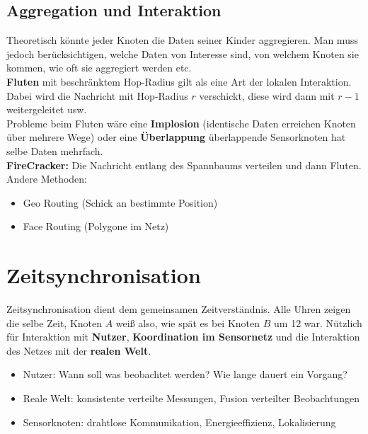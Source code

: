 \documentclass[a4paper]{article}
\begin{document}
\subsection{Aggregation und Interaktion}
Theoretisch könnte jeder Knoten die Daten seiner Kinder aggregieren. Man muss jedoch berücksichtigen, welche Daten von Interesse sind, von welchem Knoten sie kommen, wie oft sie aggregiert werden etc.\\

\textbf{Fluten} mit beschränktem Hop-Radius gilt als eine Art der lokalen Interaktion. Dabei wird die Nachricht mit Hop-Radius $r$ verschickt, diese wird dann mit $r-1$ weitergeleitet usw.\\
Probleme beim Fluten wäre eine \textbf{Implosion} (identische Daten erreichen Knoten über mehrere Wege) oder eine \textbf{Überlappung} überlappende Sensorknoten hat selbe Daten mehrfach.\\

\textbf{FireCracker:} Die Nachricht entlang des Spannbaums verteilen und dann Fluten.\\

Andere Methoden:
\begin{itemize}
	\item Geo Routing (Schick an bestimmte Position)
	\item Face Routing (Polygone im Netz)
\end{itemize}

\newpage
\section{Zeitsynchronisation}
Zeitsynchronisation dient dem gemeinsamen Zeitverständnis. Alle Uhren zeigen die selbe Zeit, Knoten $A$ weiß also, wie spät es bei Knoten $B$ um 12 war. Nützlich für Interaktion mit \textbf{Nutzer}, \textbf{Koordination im Sensornetz} und die Interaktion des Netzes mit der \textbf{realen Welt}.
\begin{itemize}
	\item Nutzer: Wann soll was beobachtet werden? Wie lange dauert ein Vorgang?
	\item Reale Welt: konsistente verteilte Messungen, Fusion verteilter Beobachtungen
	\item Sensorknoten: drahtlose Kommunikation, Energieeffizienz, Lokalisierung
\end{itemize}
\end{document}
